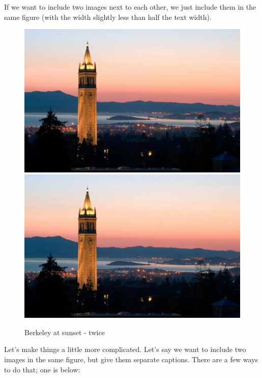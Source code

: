 \documentclass{article}
\begin{document}
If we want to include two images next to each other, we just include them in the same figure (with the width slightly less than half the text width).

\begin{figure}[h!]
	\centering	
	\includegraphics[width=.4\textwidth]{campanile.jpg}
	\includegraphics[width=.4\textwidth]{campanile.jpg}
	\caption{Berkeley at sunset - twice}
\end{figure}

Let's make things a little more complicated. Let's say we want to include two images in the same figure, but give them separate captions. There are a few ways to do that; one is below:
\end{document}
